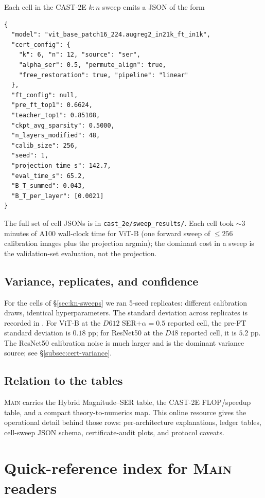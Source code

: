 \documentclass[11pt]{article}
\theoremstyle{plain}
\theoremstyle{definition}
\theoremstyle{remark}
\newcommand{\1}{\mathbf{1}}
\newcommand{\mainpaper}{\textsc{Main}}
\begin{document}
Each cell in the CAST-2E $k{:}n$ sweep emits a JSON of the form
\begin{lstlisting}[caption={Schema of a cert-aware cell-result JSON.},label=lst:cell-json]
{
  "model": "vit_base_patch16_224.augreg2_in21k_ft_in1k",
  "cert_config": {
    "k": 6, "n": 12, "source": "ser",
    "alpha_ser": 0.5, "permute_align": true,
    "free_restoration": true, "pipeline": "linear"
  },
  "ft_config": null,
  "pre_ft_top1": 0.6624,
  "teacher_top1": 0.85108,
  "ckpt_avg_sparsity": 0.5000,
  "n_layers_modified": 48,
  "calib_size": 256,
  "seed": 1,
  "projection_time_s": 142.7,
  "eval_time_s": 65.2,
  "B_T_summed": 0.043,
  "B_T_per_layer": [0.0021]
}
\end{lstlisting}
The full set of cell JSONs is in \texttt{cast\_2e/sweep\_results/}. Each cell took $\sim$3 minutes of A100 wall-clock time for ViT-B (one forward sweep of $\le 256$ calibration images plus the projection argmin); the dominant cost in a sweep is the validation-set evaluation, not the projection.

\subsection{Variance, replicates, and confidence}

For the cells of \S\ref{sec:kn-sweeps} we ran 5-seed replicates: different calibration draws, identical hyperparameters. The standard deviation across replicates is recorded in . For ViT-B at the $D612$ SER+$\alpha=0.5$ reported cell, the pre-FT standard deviation is \(0.18\) pp; for ResNet50 at the $D48$ reported cell, it is \(5.2\) pp. The ResNet50 calibration noise is much larger and is the dominant variance source; see \S\ref{subsec:cert-variance}.

\subsection{Relation to the tables}

\mainpaper{} carries the Hybrid Magnitude--SER table, the CAST-2E FLOP/speedup table, and a compact theory-to-numerics map. This online resource gives the operational detail behind those rows: per-architecture explanations, ledger tables, cell-sweep JSON schema, certificate-audit plots, and protocol caveats.

\section{Quick-reference index for \mainpaper{} readers}
\label{sec:quick-index}
\end{document}
